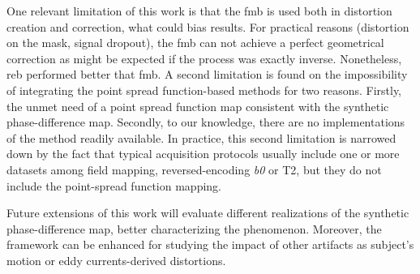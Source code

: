 One relevant limitation of this work is that the \gls*{fmb} is
used both in distortion creation and correction, what could
bias results. For practical reasons (distortion on the mask, 
signal dropout), the \gls*{fmb} can not achieve a perfect 
geometrical correction as might be
expected if the process was exactly inverse.
Nonetheless, \gls*{reb} performed better that \gls*{fmb}.
A second limitation is found on the impossibility of integrating the
point spread function-based methods for two reasons.
Firstly, the unmet need of a point spread function map consistent
with the synthetic phase-difference map. Secondly, to our knowledge,
there are no implementations of the method readily available.
In practice, this second limitation is narrowed down by the
fact that typical acquisition protocols usually include one or more
datasets among field mapping, reversed-encoding \textit{b0} or T2,
but they do not include the point-spread function mapping.

Future extensions of this work will evaluate
different realizations of the synthetic phase-difference map,
better characterizing the phenomenon. Moreover, the
framework can be enhanced for studying the impact of 
other artifacts as subject's motion or eddy 
currents-derived distortions.